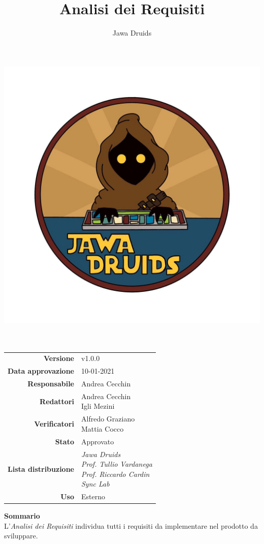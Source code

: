 



\makeatletter
\begin{titlepage}
	\begin{center}
		\vspace*{-4,0cm}
		\author{Jawa Druids}
		\title{Analisi dei Requisiti}
		\date{} %
		\includegraphics[width=0.5\linewidth]{../immagini/DRUIDSLOGO.jpg}\\[4ex]
		{\huge \bfseries  \@title }\\[2ex]
		{\LARGE  \@author}\\[50ex]
		\vspace*{-9,0cm}
		\begin{table}[H]
			\renewcommand{\arraystretch}{1.4}
			\centering
			\begin{tabular}{r | l}
				\textbf{Versione} & v1.0.0 \\%
				\textbf{Data approvazione} & 10-01-2021\\
				\textbf{Responsabile} & Andrea Cecchin\\
				\textbf{Redattori} & \makecell[tl]{Andrea Cecchin \\ Igli Mezini} \\
				\textbf{Verificatori} & \makecell[tl]{Alfredo Graziano \\ Mattia Cocco } \\
				\textbf{Stato} & Approvato\\
				\textbf{Lista distribuzione} & \makecell[tl]{\textit{Jawa Druids} \\ \textit{Prof. Tullio Vardanega} \\ \textit{Prof. Riccardo Cardin} \\ \textit{Sync Lab}}\\
				\textbf{Uso} & Esterno
			\end{tabular}
		\end{table}
		\vspace{0.2cm}
		\hfill \break
		\fontsize{17}{10}\textbf{Sommario} \\
		\vspace{0.3cm}
		L'\emph{\normalsize Analisi dei Requisiti} individua tutti i requisiti da implementare nel prodotto da sviluppare.
	\end{center}
\end{titlepage}
\makeatother

